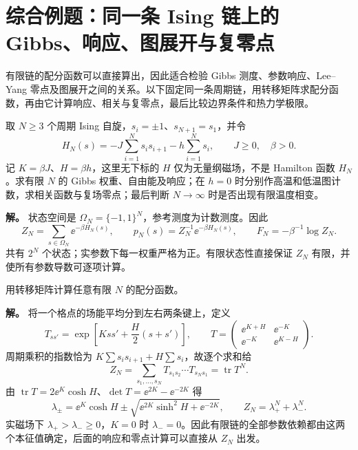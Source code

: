 \section{综合例题：同一条 Ising 链上的 Gibbs、响应、图展开与复零点}
\label{sec:phys-ising-chain-comprehensive}

有限链的配分函数可以直接算出，因此适合检验 Gibbs 测度、参数响应、Lee--Yang 零点及图展开之间的关系。以下固定同一条周期链，用转移矩阵求配分函数，再由它计算响应、相关与复零点，最后比较边界条件和热力学极限。

\begin{exbox}[统一题目与微观状态]
取 $N\ge3$ 个周期 Ising 自旋，$s_i=\pm1$、$s_{N+1}=s_1$，并令
\[
H_N(s)=-J\sum_{i=1}^Ns_is_{i+1}-h\sum_{i=1}^Ns_i,
\qquad J\ge0,\quad \beta>0.
\]
记 $K=\beta J$、$H=\beta h$，这里无下标的 $H$ 仅为无量纲磁场，不是 Hamilton 函数 $H_N$。求有限 $N$ 的 Gibbs 权重、自由能及响应；在 $h=0$ 时分别作高温和低温图计数，求相关函数与复场零点；最后判断 $N\to\infty$ 时是否出现有限温度相变。

\textbf{解。} 状态空间是 $\Omega_N=\{-1,1\}^N$，参考测度为计数测度。因此
\[
Z_N=\sum_{s\in\Omega_N}\ee^{-\beta H_N(s)},
\qquad
p_N(s)=Z_N^{-1}\ee^{-\beta H_N(s)},
\qquad F_N=-\beta^{-1}\log Z_N.
\]
共有 $2^N$ 个状态；实参数下每一权重严格为正。有限状态性直接保证 $Z_N$ 有限，并使所有参数导数可逐项计算。
\end{exbox}

\begin{exbox}
用转移矩阵计算任意有限 $N$ 的配分函数。

\textbf{解。} 将一个格点的场能平均分到左右两条键上，定义
\[
T_{ss'}=\exp\!\left[Kss'+\frac H2(s+s')\right],
\qquad
T=\begin{pmatrix}\ee^{K+H}&\ee^{-K}\\ \ee^{-K}&\ee^{K-H}\end{pmatrix}.
\]
周期乘积的指数恰为 $K\sum s_is_{i+1}+H\sum s_i$，故逐个求和给
\[
Z_N=\sum_{s_1,\ldots,s_N}T_{s_1s_2}\cdots T_{s_Ns_1}
=\operatorname{tr}T^N.
\]
由 $\operatorname{tr}T=2\ee^K\cosh H$、$\det T=\ee^{2K}-\ee^{-2K}$ 得
\[
\lambda_\pm=\ee^K\cosh H
\pm\sqrt{\ee^{2K}\sinh^2H+\ee^{-2K}},
\qquad
Z_N=\lambda_+^N+\lambda_-^N.
\]
实磁场下 $\lambda_+>\lambda_-\ge0$，$K=0$ 时 $\lambda_-=0$。因此有限链的全部参数依赖都由这两个本征值确定，后面的响应和零点计算可以直接从 $Z_N$ 出发。
\end{exbox}

